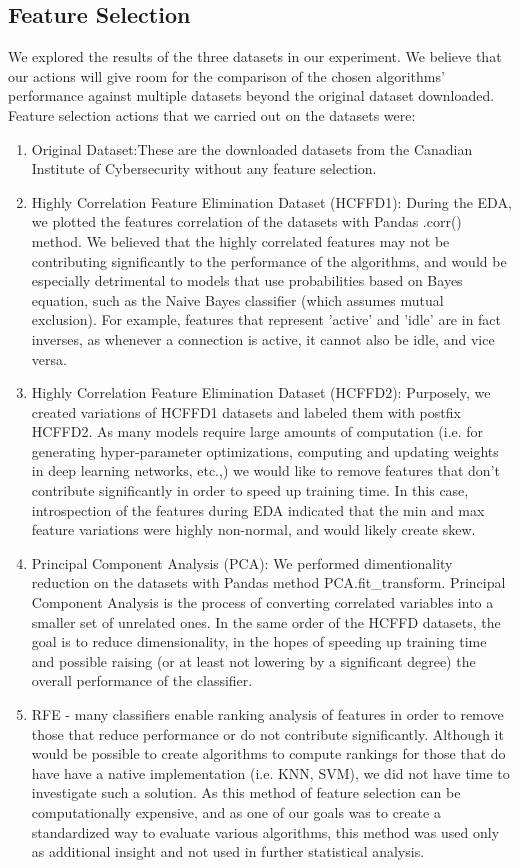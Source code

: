 \documentclass[conference]{IEEEtran}
\begin{document}
\subsection{Feature Selection}
We explored the results of the three datasets in our experiment. We believe that our actions will give room for the comparison of the chosen algorithms' performance against multiple datasets beyond the original dataset downloaded. Feature selection actions that we carried out on the datasets were:
\begin{enumerate}
  \item Original Dataset:These are the downloaded datasets from the Canadian Institute of Cybersecurity without any feature selection.
  \item Highly Correlation Feature Elimination Dataset (HCFFD1): During the EDA, we plotted the features correlation of the datasets with Pandas .corr() method. We believed that the highly correlated features may not be contributing significantly to the performance of the algorithms, and would be especially detrimental to models that use probabilities based on Bayes equation, such as the Naive Bayes classifier (which assumes mutual exclusion). For example, features that represent 'active' and 'idle' are in fact inverses, as whenever a connection is active, it cannot also be idle, and vice versa.
  \item Highly Correlation Feature Elimination Dataset (HCFFD2): Purposely, we created variations of HCFFD1 datasets and labeled them with postfix HCFFD2. As many models require large amounts of computation (i.e. for generating hyper-parameter optimizations, computing and updating weights in deep learning networks, etc.,) we would like to remove features that don't contribute significantly in order to speed up training time. In this case, introspection of the features during EDA indicated that the min and max feature variations were highly non-normal, and would likely create skew.
  \item Principal Component Analysis (PCA): We performed dimentionality reduction on the datasets with Pandas method PCA.fit\_transform. Principal Component Analysis is the process of converting correlated variables into a smaller set of unrelated ones. In the same order of the HCFFD datasets, the goal is to reduce dimensionality, in the hopes of speeding up training time and possible raising (or at least not lowering by a significant degree) the overall performance of the classifier.
  \item RFE - many classifiers enable ranking analysis of features in order to remove those that reduce performance or do not contribute significantly. Although it would be possible to create algorithms to compute rankings for those that do have have a native implementation (i.e. KNN, SVM), we did not have time to investigate such a solution. As this method of feature selection can be computationally expensive, and as one of our goals was to create a standardized way to evaluate various algorithms, this method was used only as additional insight and not used in further statistical analysis.
\end{enumerate}
\end{document}
